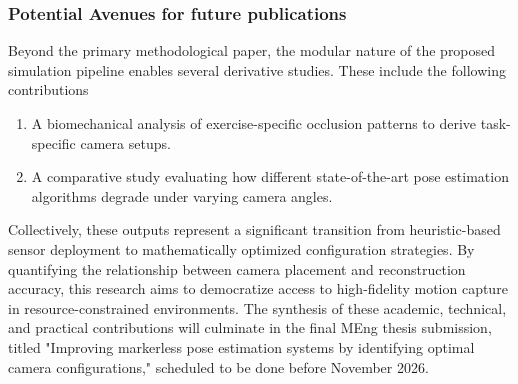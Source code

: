 \subsubsection{Potential Avenues for future publications}

Beyond the primary methodological paper, the modular nature of the proposed simulation pipeline enables several derivative studies. These include the following contributions

\begin{enumerate}
    \item A biomechanical analysis of exercise-specific occlusion patterns to derive task-specific camera setups.
    \item A comparative study evaluating how different state-of-the-art pose estimation algorithms degrade under varying camera angles.
\end{enumerate}

Collectively, these outputs represent a significant transition from heuristic-based sensor deployment to mathematically optimized configuration strategies. By quantifying the relationship between camera placement and reconstruction accuracy, this research aims to democratize access to high-fidelity motion capture in resource-constrained environments. The synthesis of these academic, technical, and practical contributions will culminate in the final MEng thesis submission, titled "Improving markerless pose estimation systems by identifying optimal camera configurations," scheduled to be done before November 2026.